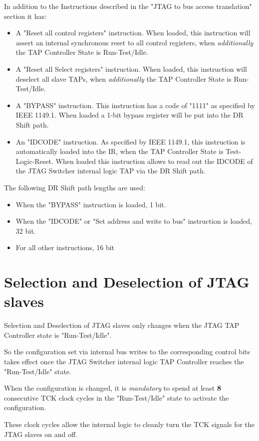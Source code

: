 \documentclass[10pt,english,a4paper]{report}
\begin{document}
In addition to the Instructions described in the "JTAG to bus access translation"
section it has:
\begin{itemize}
\item A "Reset all control registers" instruction. When loaded, this instruction will
assert an internal synchronous reset to all control registers, when {\em additionally}
the TAP Controller State is Run-Test/Idle.
\item A "Reset all Select registers" instruction. When loaded, this instruction will
deselect all slave TAPs, when {\em additionally} the TAP Controller State is Run-Test/Idle.
\item A "BYPASS" instruction. This instruction has a code of "1111" as specified by
IEEE 1149.1. When loaded a 1-bit bypass register will be put into the DR Shift path.
\item An "IDCODE" instruction. As specified by IEEE 1149.1, this instruction is
automatically loaded into the IR, when the TAP Controller State is Test-Logic-Reset.
When loaded this instruction allows to read out
the IDCODE of the JTAG Switcher internal logic TAP via the DR Shift path.
\end{itemize}

The following DR Shift path lengths are used:
\begin{itemize}
\item When the "BYPASS" instruction is loaded, 1 bit.
\item When the "IDCODE" or "Set address and write to bus" instruction is loaded, 32 bit.
\item For all other instructions, 16 bit
\end{itemize}

\section{Selection and Deselection of JTAG slaves}
Selection and Deselection of JTAG slaves only changes
when the JTAG TAP Controller state is "Run-Test/Idle".

So the configuration set via internal bus writes to the corresponding
control bits takes effect once the JTAG Switcher internal logic TAP Controller
reaches the "Run-Test/Idle" state.

When the configuration is changed, it is {\em mandatory} to spend at least
{\bf 8} consecutive TCK clock cycles in the "Run-Test/Idle" state to activate the
configuration.

These clock cycles allow the internal logic to cleanly turn the TCK signals
for the JTAG slaves on and off.
\end{document}
